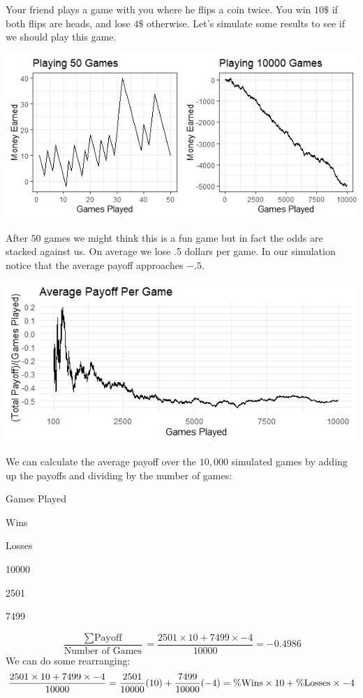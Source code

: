 \documentclass[
]{book}
\theoremstyle{definition}
\theoremstyle{definition}
\theoremstyle{definition}
\theoremstyle{remark}
\begin{document}
Your friend plays a game with you where he flips a coin twice. You win \(10\$\) if both flips are heads, and lose \(4\$\) otherwise. Let's simulate some results to see if we should play this game.

\includegraphics{Pictures/05-Expectations/Rplot02.PNG}

After \(50\) games we might think this is a fun game but in fact the odds are stacked against us. On average we lose .5 dollars per game. In our simulation notice that the average payoff approaches \(-.5\).

\includegraphics{Pictures/05-Expectations/averagepayoff.PNG}

We can calculate the average payoff over the \(10,000\) simulated games by adding up the payoffs and dividing by the number of games:

Games Played

Wins

Losses

10000

2501

7499

\[\frac{\sum \text{Payoff} }{\text{Number of Games}} = \frac{2501 \times 10 + 7499 \times {-4}}{10000}=-0.4986\]
We can do some rearranging:
\[\frac{2501 \times 10 + 7499 \times{-4}}{10000} = \frac{2501}{10000}(10)+\frac{7499}{10000}({-4}) = \\ \%  \text{Wins} \times 10 + \% \text{Losses} \times {-4}\]
\end{document}
